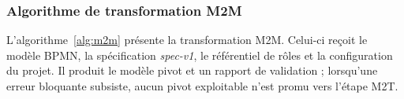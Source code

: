 

\subsubsection*{Algorithme de transformation M2M}
\label{sec:chap3-algorithme-m2m}

L'algorithme~\ref{alg:m2m} présente la transformation M2M. Celui-ci
reçoit le modèle BPMN, la spécification \textit{spec-v1}, le référentiel de rôles
et la configuration du projet. Il produit le modèle pivot et un rapport de
validation ; lorsqu'une erreur bloquante subsiste, aucun pivot exploitable n'est
promu vers l'étape M2T.


